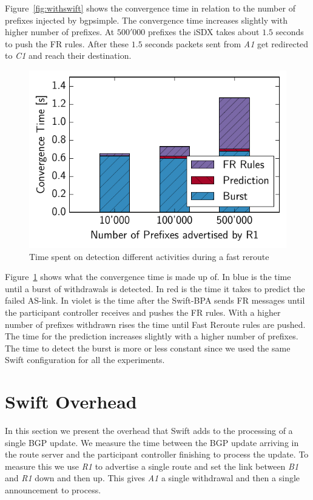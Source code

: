 Figure~\ref{fig:withswift} shows the convergence time in relation to the number of prefixes injected by bgpsimple.
The convergence time increases slightly with higher number of prefixes. At $500'000$ prefixes the iSDX takes about $1.5$ seconds to push the FR rules. After these $1.5$ seconds packets sent from \emph{A1} get redirected to \emph{C1} and reach their destination. 

\begin{figure}[h]
\center
\includegraphics[scale = 1]{Figures/barplot.pdf}
\caption{Time spent on detection different activities during a fast reroute}
\label{fig:activities}
\end{figure}

Figure~\ref{fig:activities} shows what the convergence time is made up of. In blue is the time until a burst of withdrawals is detected. In red is the time it takes to predict the failed AS-link. In violet is the time after the Swift-BPA sends FR messages until the participant controller receives and pushes the FR rules. With a higher number of prefixes withdrawn rises the time until Fast Reroute rules are pushed. The time for the prediction increases slightly with a higher number of prefixes. The time to detect the burst is more or less constant since we used the same Swift configuration for all the experiments. 

\section{\label{chapter5:Swift overhead}Swift Overhead}

In this section we present the overhead that Swift adds to the processing of a single BGP update. We measure the time between the BGP update arriving in the route server and the participant controller finishing to process the update. To measure this we use \emph{R1} to advertise a single route and set the link between \emph{B1} and \emph{R1} down and then up. This gives \emph{A1} a single withdrawal and then a single announcement to process. 

